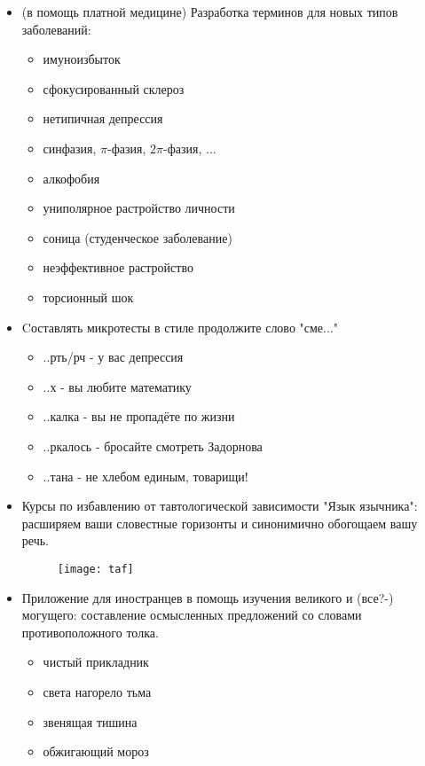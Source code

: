 \begin{itemize}
    \item (в помощь платной медицине) Разработка терминов для новых типов заболеваний:
        \begin{itemize}
            \item имуноизбыток
            \item сфокусированный склероз
            \item нетипичная депрессия
            \item синфазия, $\pi$-фазия, $2\pi$-фазия, ...
            \item алкофобия
            \item униполярное растройство личности
            \item соница (студенческое заболевание)
            \item неэффективное растройство
            \item торсионный шок
        \end{itemize}
    \item Cоставлять микротесты в стиле продолжите слово "сме..."
    \begin{itemize}
        \item[] ..рть/рч - у вас депрессия
        \item[] ..х - вы любите математику
        \item[] ..калка - вы не пропадёте по жизни
        \item[] ..ркалось - бросайте смотреть Задорнова
        \item[] ..тана - не хлебом единым, товарищи!
    \end{itemize}
    \item Курсы по избавлению от тавтологической зависимости "Язык язычника": расширяем ваши словестные горизонты и синонимично обогощаем вашу речь.
    \begin{figure}[ht!]
        \centering
        \texttt{[image: taf]}
    \end{figure}
    \item Приложение для иностранцев в помощь изучения великого и (все?-) могущего: составление осмысленных предложений со словами противоположного толка.
        \begin{itemize}
            \item чистый прикладник
            \item света нагорело тьма
            \item звенящая тишина
            \item обжигающий мороз

\end{itemize}
\end{itemize}
